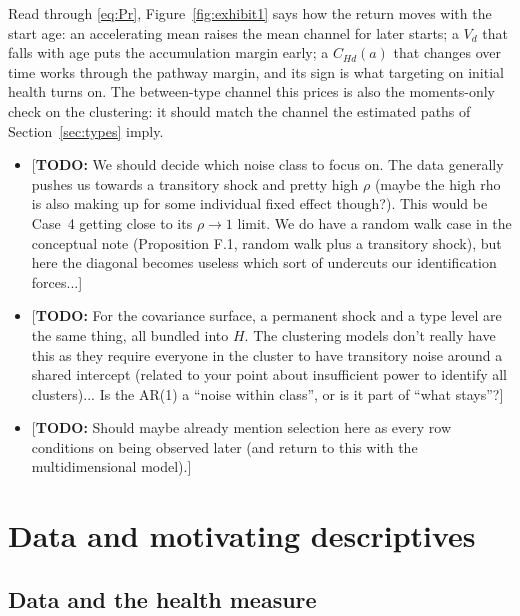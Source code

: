 \documentclass[11pt]{article}
\newcommand{\todo}[1]{\textcolor{red!75!black}{[\textbf{TODO:} #1]}}
\begin{document}
	Read through \eqref{eq:Pr}, Figure~\ref{fig:exhibit1} says how the return moves with the start age: an accelerating mean raises the mean channel for later starts; a $V_d$ that falls with age puts the accumulation margin early; a $C_{Hd}(a)$ that changes over time works through the pathway margin, and its sign is what targeting on initial health turns on. The between-type channel this prices is also the moments-only check on the clustering: it should match the channel the estimated paths of Section~\ref{sec:types} imply.

	
	\begin{itemize}
		\item \todo{We should decide which noise class to focus on. The data generally pushes us towards a transitory shock and pretty high $\rho$ (maybe the high rho is also making up for some individual fixed effect though?). This would be Case~4 getting close to its $\rho\to1$ limit. We do have a random walk case in the conceptual note (Proposition F.1, random walk plus a transitory shock), but here the diagonal becomes useless which sort of undercuts our identification forces...}
		\item \todo{For the covariance surface, a permanent shock and a type level are the same thing, all bundled into $H$. The clustering models don't really have this as they require everyone in the cluster to have transitory noise around a shared intercept (related to your point about insufficient power to identify all clusters)... Is the AR(1) a ``noise within class'', or is it part of ``what stays''?}
		\item \todo{Should maybe already mention selection here as every row conditions on being observed later (and return to this with the multidimensional model).}
	\end{itemize}
	
	
	
	\section{Data and motivating descriptives}
	\label{sec:data}
	
	\subsection{Data and the health measure}
	
\end{document}
